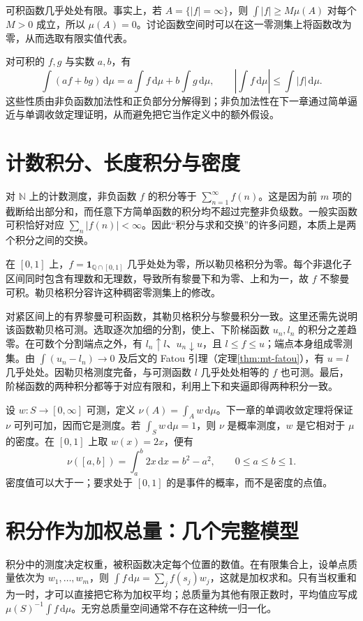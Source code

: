\documentclass[UTF8,12pt,a4paper,fontset=fandol]{ctexbook}
\begin{document}
可积函数几乎处处有限。事实上，若 $A=\{|f|=\infty\}$，则 $\int|f|\geq M\mu(A)$ 对每个 $M>0$ 成立，所以 $\mu(A)=0$。讨论函数空间时可以在这一零测集上将函数改为零，从而选取有限实值代表。

对可积的 $f,g$ 与实数 $a,b$，有
\[
 \int(af+bg)\,\mathrm d\mu
 =a\int f\,\mathrm d\mu+b\int g\,\mathrm d\mu,\qquad
 \left|\int f\,\mathrm d\mu\right|\leq\int|f|\,\mathrm d\mu.
\]
这些性质由非负函数加法性和正负部分分解得到；非负加法性在下一章通过简单逼近与单调收敛定理证明，从而避免把它当作定义中的额外假设。

\section{计数积分、长度积分与密度}
对 $\mathbb N$ 上的计数测度，非负函数 $f$ 的积分等于 $\sum_{n=1}^{\infty}f(n)$。这是因为前 $m$ 项的截断给出部分和，而任意下方简单函数的积分均不超过完整非负级数。一般实函数可积恰好对应 $\sum_n|f(n)|<\infty$。因此“积分与求和交换”的许多问题，本质上是两个积分之间的交换。

\begin{example}[零测修改改变黎曼可积性]
在 $[0,1]$ 上，$f=\mathbf1_{\mathbb Q\cap[0,1]}$ 几乎处处为零，所以勒贝格积分为零。每个非退化子区间同时包含有理数和无理数，导致所有黎曼下和为零、上和为一，故 $f$ 不黎曼可积。勒贝格积分容许这种稠密零测集上的修改。
\end{example}

对紧区间上的有界黎曼可积函数，其勒贝格积分与黎曼积分一致。这里还需先说明该函数勒贝格可测。选取逐次加细的分割，使上、下阶梯函数 $u_n,l_n$ 的积分之差趋零。在可数个分割端点之外，有 $l_n\uparrow l$、$u_n\downarrow u$，且 $l\leq f\leq u$；端点本身组成零测集。由 $\int(u_n-l_n)\to0$ 及后文的 Fatou 引理（定理\ref{thm:mt-fatou}），有 $u=l$ 几乎处处。因勒贝格测度完备，与可测函数 $l$ 几乎处处相等的 $f$ 也可测。最后，阶梯函数的两种积分都等于对应有限和，利用上下和夹逼即得两种积分一致。

\begin{example}[非负函数生成新的测度]
设 $w:S\to[0,\infty]$ 可测，定义 $\nu(A)=\int_Aw\,\mathrm d\mu$。下一章的单调收敛定理将保证 $\nu$ 可列可加，因而它是测度。若 $\int_Sw\,\mathrm d\mu=1$，则 $\nu$ 是概率测度，$w$ 是它相对于 $\mu$ 的密度。在 $[0,1]$ 上取 $w(x)=2x$，便有
\[
 \nu([a,b])=\int_a^b2x\,\mathrm dx=b^2-a^2,\qquad 0\leq a\leq b\leq1.
\]
密度值可以大于一；要求处于 $[0,1]$ 的是事件的概率，而不是密度的点值。
\end{example}

\section{积分作为加权总量：几个完整模型}
积分中的测度决定权重，被积函数决定每个位置的数值。在有限集合上，设单点质量依次为 $w_1,\ldots,w_m$，则 $\int f\,\mathrm d\mu=\sum_jf(s_j)w_j$，这就是加权求和。只有当权重和为一时，才可以直接把它称为加权平均；总质量为其他有限正数时，平均值应写成 $\mu(S)^{-1}\int f\,\mathrm d\mu$。无穷总质量空间通常不存在这种统一归一化。
\end{document}
